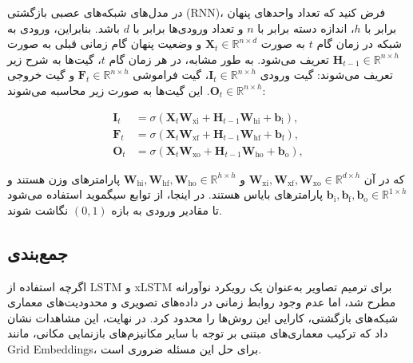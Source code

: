 در مدل‌های شبکه‌های عصبی بازگشتی (RNN)، فرض کنید که تعداد واحدهای پنهان برابر با \( h \)، اندازه دسته برابر با \( n \) و تعداد ورودی‌ها برابر با \( d \) باشد. بنابراین، ورودی به شبکه در زمان گام \( t \) به صورت \( \mathbf{X}_t \in \mathbb{R}^{n \times d} \) و وضعیت پنهان گام زمانی قبلی به صورت \( \mathbf{H}_{t-1} \in \mathbb{R}^{n \times h} \) تعریف می‌شود. به طور مشابه، در هر زمان گام \( t \)، گیت‌ها به شرح زیر تعریف می‌شوند: گیت ورودی \( \mathbf{I}_t \in \mathbb{R}^{n \times h} \)، گیت فراموشی \( \mathbf{F}_t \in \mathbb{R}^{n \times h} \) و گیت خروجی \( \mathbf{O}_t \in \mathbb{R}^{n \times h} \). این گیت‌ها به صورت زیر محاسبه می‌شوند:

\[
\begin{aligned}
	\mathbf{I}_t &= \sigma(\mathbf{X}_t \mathbf{W}_{\textrm{xi}} + \mathbf{H}_{t-1} \mathbf{W}_{\textrm{hi}} + \mathbf{b}_\textrm{i}),\\
	\mathbf{F}_t &= \sigma(\mathbf{X}_t \mathbf{W}_{\textrm{xf}} + \mathbf{H}_{t-1} \mathbf{W}_{\textrm{hf}} + \mathbf{b}_\textrm{f}),\\
	\mathbf{O}_t &= \sigma(\mathbf{X}_t \mathbf{W}_{\textrm{xo}} + \mathbf{H}_{t-1} \mathbf{W}_{\textrm{ho}} + \mathbf{b}_\textrm{o}),
\end{aligned}
\]

که در آن \( \mathbf{W}_{\textrm{xi}}, \mathbf{W}_{\textrm{xf}}, \mathbf{W}_{\textrm{xo}} \in \mathbb{R}^{d \times h} \) و \( \mathbf{W}_{\textrm{hi}}, \mathbf{W}_{\textrm{hf}}, \mathbf{W}_{\textrm{ho}} \in \mathbb{R}^{h \times h} \) پارامترهای وزن هستند و \( \mathbf{b}_\textrm{i}, \mathbf{b}_\textrm{f}, \mathbf{b}_\textrm{o} \in \mathbb{R}^{1 \times h} \) پارامترهای بایاس هستند. در اینجا، از توابع سیگموید استفاده می‌شود تا مقادیر ورودی به بازه \( (0, 1) \) نگاشت شوند.


\subsection{جمع‌بندی}
اگرچه استفاده از LSTM و xLSTM برای ترمیم تصاویر به‌عنوان یک رویکرد نوآورانه مطرح شد، اما عدم وجود روابط زمانی در داده‌های تصویری و محدودیت‌های معماری شبکه‌های بازگشتی، کارایی این روش‌ها را محدود کرد. در نهایت، این مشاهدات نشان داد که ترکیب معماری‌های مبتنی بر توجه با سایر مکانیزم‌های بازنمایی مکانی، مانند Grid Embeddings، برای حل این مسئله ضروری است.

